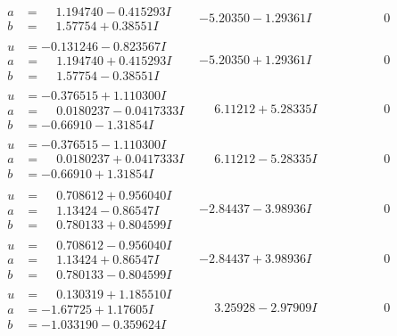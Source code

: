 \documentclass[1p]{elsarticle_modified}
\theoremstyle{definition}
\begin{document}
$$\begin{array}{c|c|c}
\begin{aligned}
a &= \phantom{-}1.194740 - 0.415293 I \\
b &= \phantom{-}1.57754 + 0.38551 I\end{aligned}
 & -5.20350 - 1.29361 I & \phantom{-0.000000 } 0 \\ \hline\begin{aligned}
u &= -0.131246 - 0.823567 I \\
a &= \phantom{-}1.194740 + 0.415293 I \\
b &= \phantom{-}1.57754 - 0.38551 I\end{aligned}
 & -5.20350 + 1.29361 I & \phantom{-0.000000 } 0 \\ \hline\begin{aligned}
u &= -0.376515 + 1.110300 I \\
a &= \phantom{-}0.0180237 - 0.0417333 I \\
b &= -0.66910 - 1.31854 I\end{aligned}
 & \phantom{-}6.11212 + 5.28335 I & \phantom{-0.000000 } 0 \\ \hline\begin{aligned}
u &= -0.376515 - 1.110300 I \\
a &= \phantom{-}0.0180237 + 0.0417333 I \\
b &= -0.66910 + 1.31854 I\end{aligned}
 & \phantom{-}6.11212 - 5.28335 I & \phantom{-0.000000 } 0 \\ \hline\begin{aligned}
u &= \phantom{-}0.708612 + 0.956040 I \\
a &= \phantom{-}1.13424 - 0.86547 I \\
b &= \phantom{-}0.780133 + 0.804599 I\end{aligned}
 & -2.84437 - 3.98936 I & \phantom{-0.000000 } 0 \\ \hline\begin{aligned}
u &= \phantom{-}0.708612 - 0.956040 I \\
a &= \phantom{-}1.13424 + 0.86547 I \\
b &= \phantom{-}0.780133 - 0.804599 I\end{aligned}
 & -2.84437 + 3.98936 I & \phantom{-0.000000 } 0 \\ \hline\begin{aligned}
u &= \phantom{-}0.130319 + 1.185510 I \\
a &= -1.67725 + 1.17605 I \\
b &= -1.033190 - 0.359624 I\end{aligned}
 & \phantom{-}3.25928 - 2.97909 I & \phantom{-0.000000 } 0 \\ \hline\begin{aligned}

\end{aligned}
\end{array}$$
\end{document}
